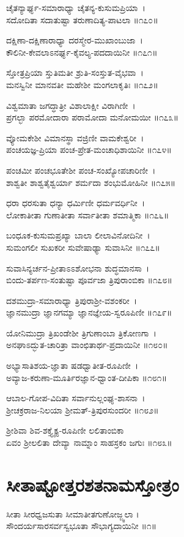 ಚೈತನ್ಯಾರ್ಘ್ಯ-ಸಮಾರಾಧ್ಯಾ ಚೈತನ್ಯ-ಕುಸುಮಪ್ರಿಯಾ~।\\
ಸದೋದಿತಾ ಸದಾತುಷ್ಟಾ ತರುಣಾದಿತ್ಯ-ಪಾಟಲಾ ॥೧೭೦॥

ದಕ್ಷಿಣಾ-ದಕ್ಷಿಣಾರಾಧ್ಯಾ ದರಸ್ಮೇರ-ಮುಖಾಂಬುಜಾ~।\\
ಕೌಲಿನೀ-ಕೇವಲಾಽನರ್ಘ್ಯ-ಕೈವಲ್ಯ-ಪದದಾಯಿನೀ ॥೧೭೧॥

ಸ್ತೋತ್ರಪ್ರಿಯಾ ಸ್ತುತಿಮತೀ ಶ್ರುತಿ-ಸಂಸ್ತುತ-ವೈಭವಾ~।\\
ಮನಸ್ವಿನೀ ಮಾನವತೀ ಮಹೇಶೀ ಮಂಗಲಾಕೃತಿಃ ॥೧೭೨॥

ವಿಶ್ವಮಾತಾ ಜಗದ್ಧಾತ್ರೀ ವಿಶಾಲಾಕ್ಷೀ ವಿರಾಗಿಣೀ~।\\
ಪ್ರಗಲ್ಭಾ ಪರಮೋದಾರಾ ಪರಾಮೋದಾ ಮನೋಮಯೀ ॥೧೭೩॥

ವ್ಯೋಮಕೇಶೀ ವಿಮಾನಸ್ಥಾ ವಜ್ರಿಣೀ ವಾಮಕೇಶ್ವರೀ~।\\
ಪಂಚಯಜ್ಞ-ಪ್ರಿಯಾ ಪಂಚ-ಪ್ರೇತ-ಮಂಚಾಧಿಶಾಯಿನೀ ॥೧೭೪॥

ಪಂಚಮೀ ಪಂಚಭೂತೇಶೀ ಪಂಚ-ಸಂಖ್ಯೋಪಚಾರಿಣೀ~।\\
ಶಾಶ್ವತೀ ಶಾಶ್ವತೈಶ್ವರ್ಯಾ ಶರ್ಮದಾ ಶಂಭುಮೋಹಿನೀ ॥೧೭೫॥

ಧರಾ ಧರಸುತಾ ಧನ್ಯಾ ಧರ್ಮಿಣೀ ಧರ್ಮವರ್ಧಿನೀ~।\\
ಲೋಕಾತೀತಾ ಗುಣಾತೀತಾ ಸರ್ವಾತೀತಾ ಶಮಾತ್ಮಿಕಾ ॥೧೭೬॥

ಬಂಧೂಕ-ಕುಸುಮಪ್ರಖ್ಯಾ ಬಾಲಾ ಲೀಲಾವಿನೋದಿನೀ~।\\
ಸುಮಂಗಲೀ ಸುಖಕರೀ ಸುವೇಷಾಢ್ಯಾ ಸುವಾಸಿನೀ ॥೧೭೭॥

ಸುವಾಸಿನ್ಯರ್ಚನ-ಪ್ರೀತಾಽಽಶೋಭನಾ ಶುದ್ಧಮಾನಸಾ~।\\
ಬಿಂದು-ತರ್ಪಣ-ಸಂತುಷ್ಟಾ ಪೂರ್ವಜಾ ತ್ರಿಪುರಾಂಬಿಕಾ ॥೧೭೮॥

ದಶಮುದ್ರಾ-ಸಮಾರಾಧ್ಯಾ ತ್ರಿಪುರಾಶ್ರೀ-ವಶಂಕರೀ~।\\
ಜ್ಞಾನಮುದ್ರಾ ಜ್ಞಾನಗಮ್ಯಾ ಜ್ಞಾನಜ್ಞೇಯ-ಸ್ವರೂಪಿಣೀ ॥೧೭೯॥

ಯೋನಿಮುದ್ರಾ ತ್ರಿಖಂಡೇಶೀ ತ್ರಿಗುಣಾಂಬಾ ತ್ರಿಕೋಣಗಾ~।\\
ಅನಘಾಽದ್ಭುತ-ಚಾರಿತ್ರಾ ವಾಂಛಿತಾರ್ಥ-ಪ್ರದಾಯಿನೀ ॥೧೮೦॥

ಅಭ್ಯಾಸಾತಿಶಯ-ಜ್ಞಾತಾ ಷಡಧ್ವಾತೀತ-ರೂಪಿಣೀ~।\\
ಅವ್ಯಾಜ-ಕರುಣಾ-ಮೂರ್ತಿರಜ್ಞಾನ-ಧ್ವಾಂತ-ದೀಪಿಕಾ ॥೧೮೧॥

ಆಬಾಲ-ಗೋಪ-ವಿದಿತಾ ಸರ್ವಾನುಲ್ಲಂಘ್ಯ-ಶಾಸನಾ~।\\
ಶ್ರೀಚಕ್ರರಾಜ-ನಿಲಯಾ ಶ್ರೀಮತ್-ತ್ರಿಪುರಸುಂದರೀ ॥೧೮೨॥

ಶ್ರೀಶಿವಾ ಶಿವ-ಶಕ್ತ್ಯೈಕ್ಯ-ರೂಪಿಣೀ ಲಲಿತಾಂಬಿಕಾ\\
ಏವಂ ಶ್ರೀಲಲಿತಾ ದೇವ್ಯಾ ನಾಮ್ನಾಂ ಸಾಹಸ್ರಕಂ ಜಗುಃ ॥೧೮೩॥
\section{ಸೀತಾಷ್ಟೋತ್ತರಶತನಾಮಸ್ತೋತ್ರಂ}
ಸೀತಾ ಸೀರಧ್ವಜಸುತಾ ಸೀಮಾತೀತಗುಣೋಜ್ಜ್ವಲಾ ।\\
ಸೌಂದರ್ಯಸಾರಸರ್ವಸ್ವಭೂತಾ ಸೌಭಾಗ್ಯದಾಯಿನೀ ॥೧॥


